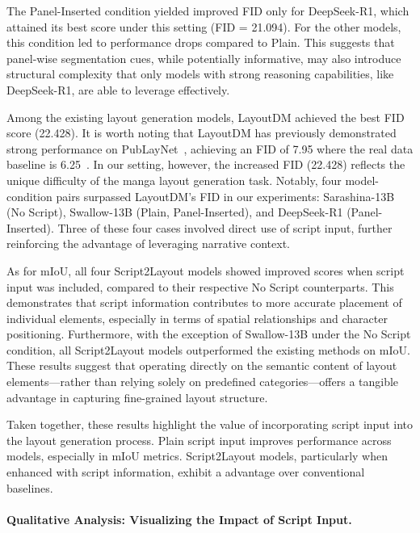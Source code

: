 \documentclass[sigconf, screen, review, anonymous]{acmart}
\begin{document}
The Panel-Inserted condition yielded improved FID only for DeepSeek-R1, which attained its best score under this setting (FID = 21.094). For the other models, this condition led to performance drops compared to Plain. This suggests that panel-wise segmentation cues, while potentially informative, may also introduce structural complexity that only models with strong reasoning capabilities, like DeepSeek-R1, are able to leverage effectively.

Among the existing layout generation models, LayoutDM achieved the best FID score (22.428). It is worth noting that LayoutDM has previously demonstrated strong performance on PubLayNet~\cite{zhong_publaynet_2019}, achieving an FID of 7.95 where the real data baseline is 6.25~\cite{inoue2023layoutdm}. In our setting, however, the increased FID (22.428) reflects the unique difficulty of the manga layout generation task. Notably, four model-condition pairs surpassed LayoutDM’s FID in our experiments: Sarashina-13B (No Script), Swallow-13B (Plain, Panel-Inserted), and DeepSeek-R1 (Panel-Inserted). Three of these four cases involved direct use of script input, further reinforcing the advantage of leveraging narrative context.

As for mIoU, all four Script2Layout models showed improved scores when script input was included, compared to their respective No Script counterparts. This demonstrates that script information contributes to more accurate placement of individual elements, especially in terms of spatial relationships and character positioning. Furthermore, with the exception of Swallow-13B under the No Script condition, all Script2Layout models outperformed the existing methods on mIoU. These results suggest that operating directly on the semantic content of layout elements—rather than relying solely on predefined categories—offers a tangible advantage in capturing fine-grained layout structure.

Taken together, these results highlight the value of incorporating script input into the layout generation process. Plain script input improves performance across models, especially in mIoU metrics. Script2Layout models, particularly when enhanced with script information, exhibit a advantage over conventional baselines.

\paragraph{Qualitative Analysis: Visualizing the Impact of Script Input.}
\end{document}
